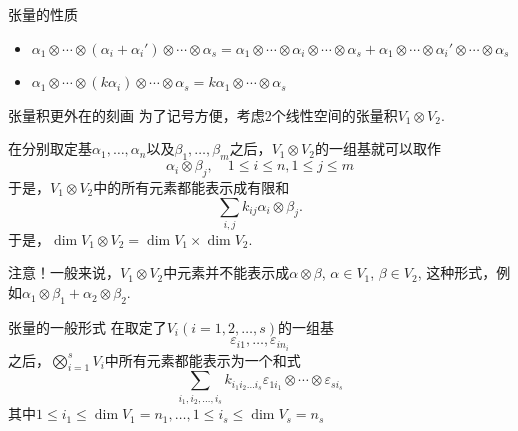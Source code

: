 
\begin{frame}

\begin{block}{张量的性质}
\begin{itemize}
\item<1-> $\alpha_1\otimes\cdots\otimes(\alpha_i+\alpha_i')\otimes\cdots\otimes\alpha_s = \alpha_1\otimes\cdots\otimes\alpha_i\otimes\cdots\otimes\alpha_s + \alpha_1\otimes\cdots\otimes\alpha_i'\otimes\cdots\otimes\alpha_s$
\vspace{1em}
\item<2-> $\alpha_1\otimes\cdots\otimes(k\alpha_i)\otimes\cdots\otimes\alpha_s = k \alpha_1\otimes\cdots\otimes\alpha_s$
\end{itemize}
\end{block}

\end{frame}


\begin{frame}

\begin{block}{张量积更外在的刻画}
为了记号方便，考虑2个线性空间的张量积$V_1\otimes V_2$.

\vspace{1em}
\pause

在分别取定基$\alpha_1,\ldots,\alpha_n$以及$\beta_1,\ldots,\beta_m$之后，$V_1\otimes V_2$的一组基就可以取作
\[\alpha_i\otimes \beta_j, \quad 1\leqslant i\leqslant n, 1\leqslant j\leqslant m\]
于是，$V_1\otimes V_2$中的所有元素都能表示成有限和
\[\sum\limits_{i,j} k_{ij} \alpha_i\otimes \beta_j.\]
于是，$\dim V_1\otimes V_2 = \dim V_1 \times \dim V_2.$

\vspace{1em}
\pause

{\color{red}注意}！一般来说，$V_1\otimes V_2$中元素并不能表示成$\alpha\otimes\beta$, $\alpha\in V_1$, $\beta\in V_2$, 这种形式，例如$\alpha_1\otimes \beta_1 + \alpha_2\otimes\beta_2$.
\end{block}

\end{frame}


\begin{frame}

\begin{block}{张量的一般形式}
在取定了$V_i (i=1,2,\ldots,s)$的一组基
\[\varepsilon_{i1},\ldots,\varepsilon_{in_i}\]
之后，$\bigotimes\limits_{i=1}^s V_i$中所有元素都能表示为一个和式
\[\sum\limits_{i_1,i_2,\ldots,i_s} k_{i_1i_2\ldots i_s} \varepsilon_{1i_1} \otimes \cdots \otimes \varepsilon_{si_s}\]
其中$1\leqslant i_1\leqslant \dim V_1 = n_1, \ldots, 1\leqslant i_s\leqslant \dim V_s = n_s$
\end{block}

\end{frame}


